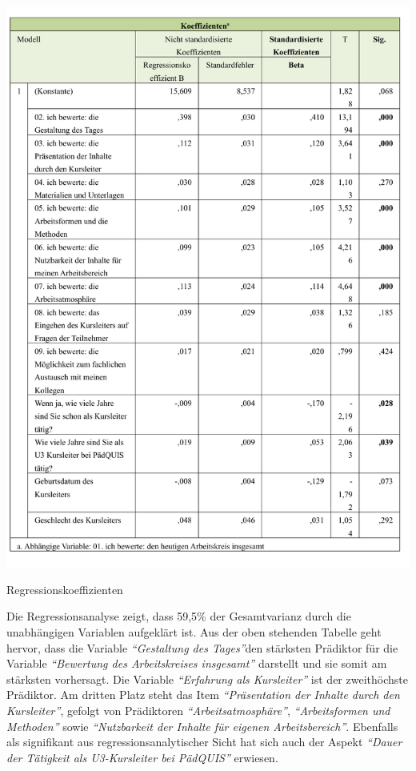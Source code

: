 \documentclass[12pt,a4paper]{article}
\begin{document}
\begin{table}[!ht]
\includegraphics[scale=0.8]{tab08.pdf}
\caption{Regressionskoeffizienten}
\label{tab.4}
\end{table}
\FloatBarrier

Die Regressionsanalyse zeigt, dass 59,5\% der Gesamtvarianz durch die unabhängigen Variablen aufgeklärt ist. Aus der oben stehenden Tabelle geht hervor, dass die Variable \textit{"`Gestaltung des Tages"'}den stärksten Prädiktor für die Variable \textit{"`Bewertung des Arbeitskreises insgesamt"'} darstellt und sie somit am stärksten vorhersagt. Die Variable \textit{"`Erfahrung als Kursleiter"'} ist der zweithöchste Prädiktor. Am dritten Platz steht das Item \textit{"`Präsentation der Inhalte durch den Kursleiter"'}, gefolgt von Prädiktoren \textit{"`Arbeitsatmosphäre"'},  \textit{"`Arbeitsformen und Methoden"'} sowie \textit{"`Nutzbarkeit der Inhalte für eigenen Arbeitsbereich"'}. Ebenfalls als signifikant aus regressionsanalytischer Sicht hat sich auch der Aspekt \textit{"`Dauer der Tätigkeit als U3-Kursleiter bei PädQUIS"'} erwiesen. 
\end{document}
